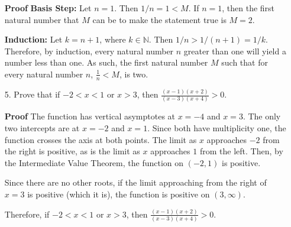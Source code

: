 \documentclass[12pt]{article}
\begin{document}
\begin{enumerate}
  \item[\textbf{Proof}] \textbf{Basis Step:} Let $n=1$. Then $1/n=1<M$. If $n=1$, then the first natural number that $M$ can be to make the statement true is $M=2$.
  \item[] \textbf{Induction:} Let $k=n+1$, where $k\in\mathbb{N}$. Then $1/n>1/(n+1)=1/k$. Therefore, by induction, every natural number $n$ greater than one will yield a number less than one. As such, the first natural number $M$ such that for every natural number $n$, $\frac{1}{n} < M$, is two.
\end{enumerate}

\begin{enumerate}
\item[5.] Prove that if $-2 < x < 1$ or $x > 3$, then $\frac{(x-1)(x+2)}{(x-3)(x+4)} > 0$.
\end{enumerate}

\begin{enumerate}
  \item[\textbf{Proof}] The function has vertical asymptotes at $x=-4$ and $x=3$. The only two intercepts are at $x=-2$ and $x=1$. Since both have multiplicity one, the function crosses the axis at both points. The limit as $x$ approaches $-2$ from the right is positive, as is the limit as $x$ approaches $1$ from the left. Then, by the Intermediate Value Theorem, the function on $(-2,1)$ is positive.
  \item[] Since there are no other roots, if the limit approaching from the right of $x=3$ is positive (which it is), the function is positive on $(3,\infty)$.
  \item[] Therefore, if $-2 < x < 1$ or $x > 3$, then $\frac{(x-1)(x+2)}{(x-3)(x+4)} > 0$.
\end{enumerate}
\end{document}
